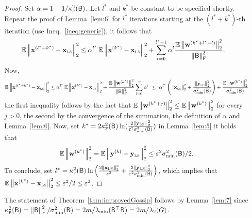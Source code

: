%
%
\begin{proof}
Set $\alpha = 1 - 1/\kappaFS(\matB)$. Let $l^*$ and $k^*$ be constant to be specified shortly. Repeat the proof of Lemma~\ref{lem:6} for $l^*$ iterations starting at the $(l^*+k^*)$-th iteration (use Ineq.~\eqref{ineq:generic}), it follows that
\begin{align*}
	\EE \norm{\x^{(l^* + k^*)} - \xls}^2  & \leq   \alpha^{l^*} \EE\norm{\x^{(k^*)} - \xls}^2 + \sum_{l=0}^{l^* - 1}\alpha^l \frac{\EE\norm{\w^{(k^* + l^* - l)}}^2}{\frobnorm{\matB}^2}.
\end{align*}
Now,
%
\begin{align*}
\EE \norm{\x^{(l^* + k^*)} - \xls}^2			  & \leq  \alpha^{l^*} \EE\norm{\x^{(k^*)} - \xls}^2 + \frac{\EE\norm{\w^{(k^*)}}^2}{\frobnorm{\matB}^2}\sum_{l=0}^{\infty}\alpha^l \ \leq \  \alpha^{l^*} \left(\norm{\xls}^2 + \frac{\norm{\yls}^2}{\sigma_{\min}^2(\matB)} \right) + \frac{\EE\norm{\w^{(k^*)}}^2}{\sigma_{\min}^2(\matB)} \\
\end{align*}
%
the first inequality follows by the fact that $\EE\norm{\w^{(k^* + j)}}^2 \leq \EE\norm{\w^{(k^*)}}^2$ for every $j>0$, the second by the convergence of the summation, the definition of $\alpha$ and Lemma~\ref{lem:6}. Now, set $k^* = 2\kappaFS(\matB) \ln( \frac{2\norm{\yls}^2}{\eps^2\sigma_{\min}^2(\matB)})$ in Lemma~\ref{lem:5} it holds that
\[
\EE\norm{\w^{(k^*)}}^2 = \EE\norm{\y^{(k)} - \yls}^2 \leq \eps^2 \sigma_{\min}^2(\matB) / 2.
\]
To conclude, set $l^* = \kappaFS(\matB)\ln\left(\frac{2\norm{\xls}^2}{\eps^2} + \frac{2\norm{\yls}^2}{\eps^2\sigma_{\min}^2(\matB)} \right)$, which implies that $\EE \norm{\x^{(k^*)} - \xls }^2 \leq \eps^2/2 \leq \eps^2$.
\end{proof}
The statement of Theorem~\ref{thm:improvedGossip} follows by Lemma~\ref{lem:7} since $\kappaFS(\matB) = \frobnorm{\matB}^2 / \sigma_{\min}^2(\matB) = 2m / \lambda_{\min}(\matB^\top \matB) = 2m / \lambda_2(G)$.
